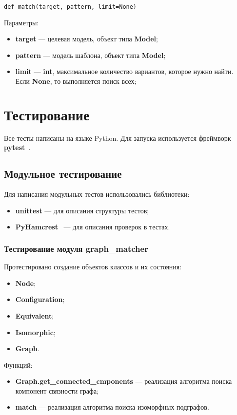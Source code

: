 \begin{verbatim}
def match(target, pattern, limit=None)
\end{verbatim}

Параметры:
\begin{itemize}
\item \textbf{target} --- целевая модель, объект типа \textbf{Model};
\item \textbf{pattern} --- модель шаблона, объект типа \textbf{Model};
\item \textbf{limit} --- \textbf{int}, максимальное количество
вариантов, которое нужно найти. Если \textbf{None}, то выполняется поиск всех;
\end{itemize}

\section{Тестирование}

Все тесты написаны на языке Python.
Для запуска используется фреймворк \textbf{pytest}~\cite{pytest}.

\subsection{Модульное тестирование}

Для написания модульных тестов использовались библиотеки:
\begin{itemize}
\item \textbf{unittest} --- для описания структуры тестов;
\item \textbf{PyHamcrest}~\cite{PyHamcrest} --- для описания проверок в тестах.
\end{itemize}

\subsubsection{Тестирование модуля graph\_matcher}

Протестировано создание объектов классов и их состояния:
\begin{itemize}
\item \textbf{Node};
\item \textbf{Configuration};
\item \textbf{Equivalent};
\item \textbf{Isomorphic};
\item \textbf{Graph}.
\end{itemize}

Функций:
\begin{itemize}
\item \textbf{Graph.get\_connected\_cmponents} --- реализация алгоритма поиска
компонент связности графа;
\item \textbf{match} --- реализация алгоритма поиска изоморфных подграфов.
\end{itemize}

